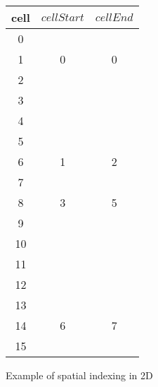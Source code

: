 \begin{figure}[p]
\begin{minipage}[t]{.65\linewidth}
\begin{tikzpicture}
            

            
        \end{tikzpicture}
    \end{minipage}%
    \begin{minipage}[t]{.43\linewidth}
        \vspace{0pt}
        \centering
        \begin{tabular}{|c | c | c|} 
            \hline
            cell & $cellStart$ & $cellEnd$ \\ [0.5ex] 
            \hline\hline
            0 & ~ & ~ \\ 
            \hline
            1 & 0 & 0 \\ 
            \hline
            2 & ~ & ~ \\ 
            \hline
            3 & ~ & ~ \\ 
            \hline
            4 & ~ & ~ \\ 
            \hline
            5 & ~ & ~ \\ 
            \hline
            6 & 1 & 2 \\ 
            \hline
            7 & ~ & ~ \\ 
            \hline
            8 & 3 & 5 \\ 
            \hline
            9 & ~ & ~ \\ 
            \hline
            10 & ~ & ~ \\ 
            \hline
            11 & ~ & ~ \\ 
            \hline
            12 & ~ & ~ \\ 
            \hline
            13 & ~ & ~ \\ 
            \hline
            14 & 6 & 7 \\ 
            \hline
            15 & ~ & ~ \\ 
            \hline

            
        \end{tabular}
    \end{minipage}%

    \caption{Example of spatial indexing in 2D}
    \label{figure spatial indexing}
\end{figure}


